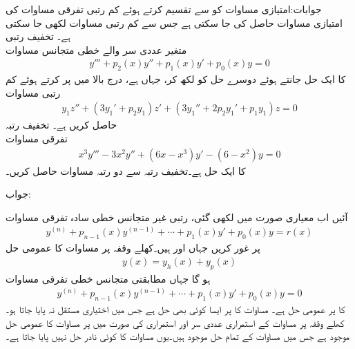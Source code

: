 جوابات:امتیازی مساوات کو   سے تقسیم کرتے ہوئے کم رتبی تفرقی مساوات کی امتیازی مساوات حاصل کی جا سکتی ہے جس سے کم رتبی مساوات لکھی جا سکتی ہے۔
\quad تخفیف رتبی\\
متغیر عددی سر والے خطی متجانس مساوات
\begin{align*}
y'''+p_2(x)y''+p_1(x)y'+p_0(x)y=0
\end{align*}
کا ایک حل  جانتے ہوئے دوسرے حل کو  لکھ کر، جہاں  ہے، درج بالا میں پر کرتے ہوئے کم رتبی مساوات 
\begin{align*}
y_1z''+(3y_1'+p_2y_1)z'+(3y_1''+2p_2y_1'+p_1y_1)z=0
\end{align*}
حاصل کریں  ہے۔
\quad تخفیف رتبہ\\
تفرقی مساوات 
\begin{align*}
x^3y'''-3x^2y''+(6x-x^3)y'-(6-x^2)y=0
\end{align*}
کا ایک حل  ہے۔تخفیف رتبہ سے دو رتبہ مساوات حاصل کریں۔

جواب:

آئیں اب معیاری صورت میں لکھی گئی،  رتبی غیر متجانس خطی سادہ تفرقی مساوات
\begin{align}\label{مساوات_سادہ_بلند_غیر_متجانس_الف}
y^{(n)}+p_{n-1}(x)y^{(n-1)}+\cdots+p_1(x)y'+p_0(x)y=r(x)
\end{align}
پر غور کریں جہاں  اور  ہیں۔کھلے وقفہ  پر مساوات  کا عمومی حل
\begin{align}\label{مساوات_سادہ_بلند_غیر_متجانس_ب}
y(x)=y_h(x)+y_p(x)
\end{align}
ہو گا جہاں  مطابقتی متجانس خطی تفرقی مساوات
\begin{align}\label{مساوات_سادہ_بلند_مطابقتی_متجانس_الف}
y^{(n)}+p_{n-1}(x)y^{(n-1)}+\cdots+p_1(x)y'+p_0(x)y=0
\end{align}
کا  پر عمومی حل ہے۔  مساوات   کا  پر  ایسا کوئی بھی حل ہے جس میں اختیاری مستقل نہ پایا جاتا ہو۔ کھلے وقفہ  پر مساوات  کے استمراری عددی سر اور استمراری  کی صورت میں  پر مساوات  کا عمومی حل موجود ہے جس میں مساوات  کے تمام حل موجود ہیں۔یوں مساوات  کا کوئی نادر حل نہیں پایا جاتا ہے۔

